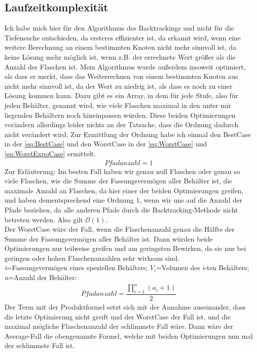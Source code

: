 \documentclass[10pt,a4paper]{scrartcl}
\begin{document}
\subsection{Laufzeitkomplexität}
Ich habe mich hier für den Algorithmus des \glqq{}Backtrackings\grqq{} und nicht für die \glqq{}Tiefensuche\grqq{} entschieden, da ersteres effizienter ist, da erkannt wird, wenn eine weitere Berechnung an einem bestimmten Knoten nicht mehr sinnvoll ist, da keine Lösung mehr möglich ist, wenn z.B. der errechnete Wert größer als die Anzahl der Flaschen ist. Mein Algorithmus wurde außerdem insoweit optimiert, als dass er merkt, dass das Weiterrechnen von einem bestimmten Knoten aus nicht mehr sinnvoll ist, da der Wert zu niedrig ist, als dass es noch zu einer Lösung kommen kann. Dazu gibt es ein Array, in dem für jede Stufe, also für jeden Behälter, genannt wird, wie viele Flaschen maximal in den unter mir liegenden Behältern noch hineinpassen würden. Diese beiden Optimierungen verändern allerdings leider nichts an der Tatsache, dass die Ordnung dadurch nicht verändert wird. Zur Ermittlung der Ordnung habe ich einmal den BestCase in der
\autoref{eq:BestCase} und den WorstCase in der 
\autoref{eq:WorstCase} und
\autoref{eq:WorstExpoCase} ermittelt.\\
\begin{align}
	Pfadanzahl=1 \label{eq:BestCase}
\end{align}
Zur Erläuterung: Im besten Fall haben wir genau null Flaschen oder genau so viele Flaschen, wie die Summe der Fassungsvermögen aller Behälter ist, die maximale Anzahl an Flaschen, da hier einer der beiden Optimierungen greifen, und haben dementsprechend eine Ordnung 1, wenn wir uns auf die Anzahl der Pfade beziehen, da alle anderen Pfade durch die \glqq{}Backtracking\grqq{}-Methode nicht betreten werden. Also gilt $\mathcal{O} {(1)}$.\\
 Der WorstCase wäre der Fall, wenn die Flaschenanzahl genau die Hälfte der Summe der Fassungsvermögen aller Behälter ist. Dann würden beide Optimierungen nur teilweise greifen und am geringsten Bewirken, da sie nur bei geringen oder hohen Flaschenanzahlen sehr wirksam sind. \\ \textit{i}=Fassungsvermögen eines speziellen Behälters; $\textit{V}_{i}$=Volumen des \textit{i}-ten Behälters; \textit{n}=Anzahl der Behälter:
\begin{align}
	Pfadanzahl=\dfrac{\prod\limits_{i=1}^{n} (a_{i}+1)}{2} \label{eq:WorstCase}
\end{align}
Der Term mit der Produktformel setzt sich mit der Annahme auseinander, dass die letzte Optimierung nicht greift und der WorstCase der Fall ist, und die maximal mögliche Flaschenanzahl der schlimmste Fall wäre. Dann wäre der Average-Fall die obengenannte Formel, welche mit beiden Optimierungen nun mal der schlimmste Fall ist. \\
\end{document}

